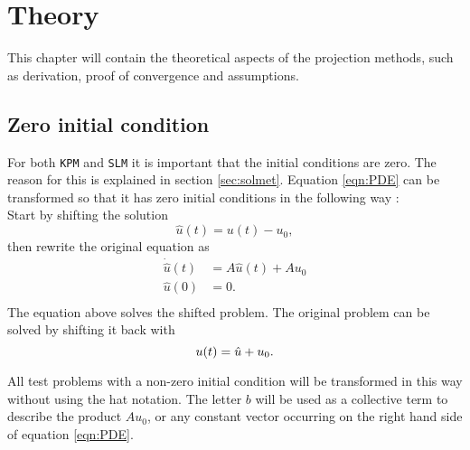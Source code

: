 \chapter{Theory}
This chapter will contain the theoretical aspects of the projection methods, such as derivation, proof of convergence and assumptions. 
 
\section{Zero initial condition}%
\label{sec:inittransf}
For both \texttt{KPM} and \texttt{SLM} it is important that the initial conditions are zero. The reason for this is explained in section \ref{sec:solmet}. Equation \eqref{eqn:PDE} can be transformed so that it has zero initial conditions in the following way \cite{zerotransf}: \\
Start by shifting the solution
\begin{equation*}
\hat{u}(t) = u(t)-u_0,
\end{equation*}
then rewrite the original equation as
\begin{equation}
\begin{aligned}
\dot{\hat{u}}(t) &= A \hat{u}(t) +A u_0\\
 \hat{u}(0)&= 0. \\
\end{aligned}
\label{eqn:shiftedproblem}
\end{equation}
\noindent The equation above solves the shifted problem. The original problem can be solved by shifting it back with
\begin{equation*}
 u(t) = \hat{u} + u_0. \\
\end{equation*}


\noindent All test problems with a non-zero initial condition will be transformed in this way without using the hat notation. The letter $b$ will be used as a collective term to describe the product $A u_0$, or any constant vector occurring on the right hand side of equation \eqref{eqn:PDE}.

